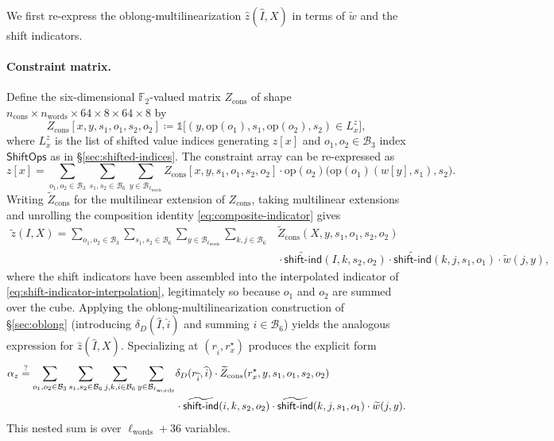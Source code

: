 \documentclass{article}
\theoremstyle{definition}
\newcommand*{\mle}{\widetilde}
\newcommand{\BB}{\mathcal{B}}
\newcommand{\FF}[1]{\mathbb{F}_{#1}}
\begin{document}
We first re-express the oblong-multilinearization $\widehat{z}(\widehat{I}, X)$ in terms of $\mle{w}$ and the shift indicators.

\paragraph{Constraint matrix.}
Define the six-dimensional $\FF{2}$-valued matrix $Z_\text{cons}$ of shape $n_\text{cons} \times n_\text{words} \times 64 \times 8 \times 64 \times 8$ by
\[
  Z_\text{cons}[x, y, s_1, o_1, s_2, o_2] \coloneqq \mathbb{1}\bigl[ (y, \text{op}(o_1), s_1, \text{op}(o_2), s_2) \in L^z_x \bigr],
\]
where $L^z_x$ is the list of shifted value indices generating $z[x]$ and $o_1, o_2 \in \BB_3$ index $\textsf{ShiftOps}$ as in \S\ref{sec:shifted-indices}. The constraint array can be re-expressed as
\[
  z[x] = \sum_{o_1, o_2 \in \BB_3} \sum_{s_1, s_2 \in \BB_6} \sum_{y \in \BB_{\ell_\text{words}}} Z_\text{cons}[x, y, s_1, o_1, s_2, o_2] \cdot \text{op}(o_2)\bigl( \text{op}(o_1)(w[y], s_1), s_2 \bigr).
\]
Writing $\mle{Z}_\text{cons}$ for the multilinear extension of $Z_\text{cons}$, taking multilinear extensions and unrolling the composition identity \eqref{eq:composite-indicator} gives
\begin{align*}
  \mle{z}(I, X) = \sum_{o_1, o_2 \in \BB_3} \sum_{s_1, s_2 \in \BB_6} \sum_{y \in \BB_{\ell_\text{words}}} \sum_{k, j \in \BB_6} &\mle{Z}_\text{cons}(X, y, s_1, o_1, s_2, o_2) \\
  &{} \cdot \mle{\textsf{shift-ind}}(I, k, s_2, o_2) \cdot \mle{\textsf{shift-ind}}(k, j, s_1, o_1) \cdot \mle{w}(j, y),
\end{align*}
where the shift indicators have been assembled into the interpolated indicator of \eqref{eq:shift-indicator-interpolation}, legitimately so because $o_1$ and $o_2$ are summed over the cube. Applying the oblong-multilinearization construction of \S\ref{sec:oblong} (introducing $\delta_D(\widehat{I}, \widehat{i})$ and summing $i \in \BB_6$) yields the analogous expression for $\widehat{z}(\widehat{I}, X)$. Specializing at $(r_{\widehat{i}}, r^\star_x)$ produces the explicit form
\begin{align}
  \alpha_z \stackrel{?}{=} \sum_{o_1, o_2 \in \BB_3} \sum_{s_1, s_2 \in \BB_6} \sum_{j, k, i \in \BB_6} \sum_{y \in \BB_{\ell_\text{words}}} &\delta_D(r_{\widehat{i}}, \widehat{i}) \cdot \mle{Z}_\text{cons}(r^\star_x, y, s_1, o_1, s_2, o_2) \notag \\
  &{} \cdot \mle{\textsf{shift-ind}}(i, k, s_2, o_2) \cdot \mle{\textsf{shift-ind}}(k, j, s_1, o_1) \cdot \mle{w}(j, y).
  \label{eq:shift-reduction-claim}
\end{align}
This nested sum is over $\ell_\text{words} + 36$ variables.
\end{document}

